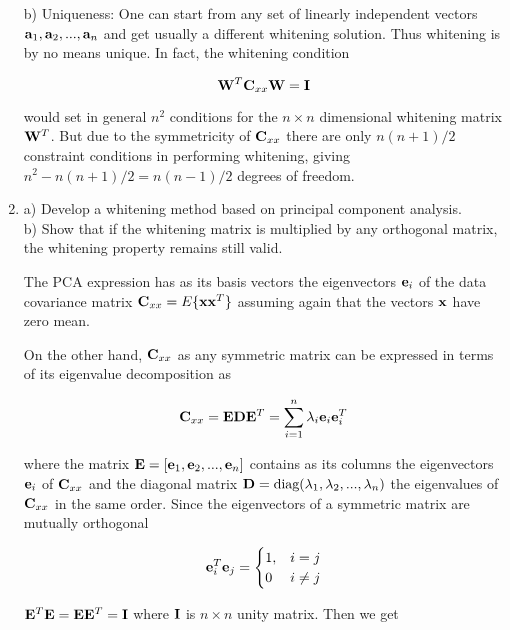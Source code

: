 \begin{enumerate}
\begin{solution}
    b) Uniqueness: One can start from any set of linearly independent vectors
    $\mathbf{a}_1, \mathbf{a}_2, ..., \mathbf{a}_n$ and get usually a different whitening
    solution. Thus whitening is by no means unique. In fact, the whitening
    condition

    \[
    \mathbf{W}^T\mathbf{C}_{xx}\mathbf{W}=\mathbf{I}
    \]

    would set in general $n^2$ conditions for the $n\times n$ dimensional whitening
    matrix $\mathbf{W}^T$. But due to the symmetricity of $\mathbf{C}_{xx}$ there are
    only $n(n+1)/2$ constraint conditions in performing whitening, giving
    $n^2-n(n+1)/2=n(n-1)/2$ degrees of freedom.


  \end{solution}


\item a) Develop a whitening method based on principal component analysis.\\
  b) Show that if the whitening matrix is multiplied by any orthogonal
  matrix, the whitening property remains still valid.

  \begin{solution}

    The PCA expression has as its basis vectors the eigenvectors
    $\mathbf{e}_i$ of the data covariance matrix $\mathbf{C}_{xx}=E\lbrace
    \mathbf{x}\mathbf{x}^T\rbrace$ assuming again that the vectors $\mathbf{x}$
    have zero mean.

    On the other hand, $\mathbf{C}_{xx}$ as any symmetric matrix can be expressed
    in terms of its eigenvalue decomposition as

    \[
    \mathbf{C}_{xx} = \mathbf{E}\mathbf{D}\mathbf{E}^T = \sum_{i=1}^{n} \lambda_i \mathbf{e}_i \mathbf{e}_i^T
    \]

    where the matrix $\mathbf{E}=\left[ \mathbf{e}_1, \mathbf{e}_2, ...,
      \mathbf{e}_n \right]$ contains as its columns the
    eigenvectors $\mathbf{e}_i$ of $\mathbf{C}_{xx}$ and the diagonal matrix $\mathbf{D}=\text{diag}(\lambda_1,
    \lambda_2, ..., \lambda_n)$ the eigenvalues of $\mathbf{C}_{xx}$ in the same
    order. Since the eigenvectors of a symmetric matrix are mutually
    orthogonal

    \[
    \mathbf{e}_i^T\mathbf{e}_j = \begin{cases}1, &i=j\\0 &i\neq
      j\end{cases}
    \]


    $\mathbf{E}^T\mathbf{E} = \mathbf{E}\mathbf{E}^T = \mathbf{I}$ where $\mathbf{I}$ is $n\times n$ unity matrix. Then we get


\end{solution}
\end{enumerate}
